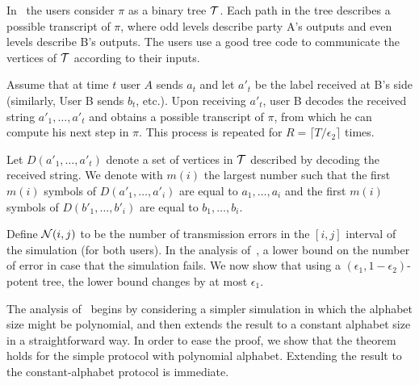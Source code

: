 \documentclass[ letterpaper, 11pt]{article}
\newcommand{\potent}{potent\xspace}
\begin{document}
In~\cite{BR10} the users consider $\pi$ as a binary tree $\cal T$. Each path in the tree describes a possible transcript of $\pi$, where  odd levels describe party A's outputs and even levels describe B's outputs. The users use a good tree code to communicate the vertices of $\cal T$ according to their inputs.

Assume that at time $t$ user $A$ sends $a_t$ and let $a'_t$ be the label received at B's side
(similarly, User B sends $b_t$, etc.).
Upon receiving $a'_t$, user B decodes the received string $a'_1, \ldots, a'_t$ and obtains a possible transcript of $\pi$, from which he can compute his next step in $\pi$. This process is repeated for $R=\lceil T/\epsilon_2\rceil$ times.

Let $D(a'_1,\ldots, a'_t)$ denote a set of vertices in $\cal T$ described by decoding the received string. We denote with $m(i)$ the largest number such that the first $m(i)$ symbols of $D(a'_1, \ldots, a'_i)$ are equal to $a_1, \ldots, a_i$ and the first $m(i)$ symbols of $D(b'_1, \ldots, b'_i)$ are equal to $b_1, \ldots, b_i$.

Define ${\cal N}(i,j)$ to be the number of transmission errors in the $[i,j]$ interval of the simulation (for both users). In the analysis of~\cite{BR10}, a lower bound on the number of error in case that the simulation fails. We now show that using a $(\epsilon_1,1-\epsilon_2)$-\potent tree, the lower bound
changes by at most $\epsilon_1$.

The analysis of~\cite{BR10} begins by considering a simpler simulation in which the alphabet
size might be polynomial, and then extends the result to a constant alphabet size in a straightforward way. In order to ease the proof, we show that the theorem holds for the simple protocol with polynomial alphabet. Extending the result to the constant-alphabet protocol is immediate.
\end{document}
